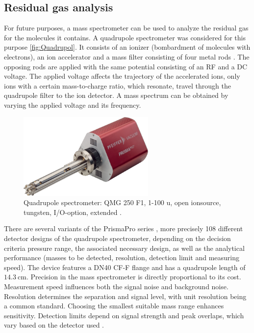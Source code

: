 \subsection{Residual gas analysis}

For future purposes, a mass spectrometer can be used to analyze the residual gas for the molecules it contains.
A quadrupole spectrometer was considered for this purpose \autoref{fig:Quadrupol}.
It consists of an ionizer (bombardment of molecules with electrons), an ion accelerator and a mass filter consisting of four metal rods \cite{quardrupolmassspec}.
The opposing rods are applied with the same potential consisting of an RF and a DC voltage.
The applied voltage affects the trajectory of the accelerated ions, only ions with a certain mass-to-charge ratio, which resonate, travel through the quadrupole filter to the ion detector.
A mass spectrum can be obtained by varying the applied voltage and its frequency.

\begin{figure}[H]
    \centering
    \includegraphics[width=0.6\textwidth]{sections/imges/vacuum_vessel/Quadrupol_Massenspektrometer.PNG}
    \caption{Quadrupole spectrometer: QMG 250 F1, 1-100 u, open ionsource, tungsten, I/O-option, extended \cite{pfeiffer}.}
    \label{fig:Quadrupol}
\end{figure}

There are several variants of the PrismaPro series \cite{pfeiffer}, more precisely 108 different detector designs of the quadrupole spectrometer, depending on the decision criteria pressure range, the associated necessary design, as well as the analytical performance (masses to be detected, resolution, detection limit and measuring speed).
The device features a DN40 CF-F flange and has a quadrupole length of $\SI{14.3}{\centi\meter}$.
Precision in the mass spectrometer is directly proportional to its cost.
Measurement speed influences both the signal noise and background noise.
Resolution determines the separation and signal level, with unit resolution being a common standard.
Choosing the smallest suitable mass range enhances sensitivity.
Detection limits depend on signal strength and peak overlaps, which vary based on the detector used \cite{pfeiffer}.


